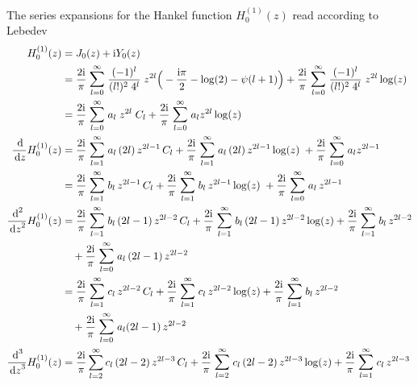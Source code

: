 The series expansions for the Hankel function $H_0^{(1)}(z)$ read according to Lebedev  \cite{lebedev}
\begin{align*}
  H_0^{(1)}(z)
  &= J_0(z) + \ii Y_0(z) \\
  &= \frac{2 \ii}{\pi} \; \mathlarger{\sum}_{l = 0}^\infty \; \frac{(-1)^l}{(l!)^2 \; 4^l} \;  z^{2l} \Big( -\frac{\ii \pi}{2} - \log(2) - \psi(l + 1) \Big) + \frac{2 \ii}{\pi} \; \mathlarger{\sum}_{l = 0}^\infty \; \frac{(-1)^l}{(l!)^2 \; 4^l} \;  z^{2l} \log(z) \\
  &= \frac{2 \ii}{\pi} \; \mathlarger{\sum}_{l = 0}^\infty \; a_l \;  z^{2l} \; C_l + \frac{2 \ii}{\pi} \; \mathlarger{\sum}_{l = 0}^\infty \; a_l z^{2l} \log(z) \\
  \frac{\d{}}{\d z} H_0^{(1)}(z)
  &= \frac{2 \ii}{\pi} \; \mathlarger{\sum}_{l = 1}^\infty \; a_l \,  (2l) \, z^{2l - 1} \, C_l + \frac{2 \ii}{\pi}  \; \mathlarger{\sum}_{l = 1}^\infty \; a_l \, (2l)  \, z^{2l - 1} \log(z) \; + \frac{2 \ii}{\pi}\; \mathlarger{\sum}_{l = 0}^\infty \; a_l z^{2l - 1} \\
  &= \frac{2 \ii}{\pi} \; \mathlarger{\sum}_{l = 1}^\infty \; b_l \, z^{2l - 1} \, C_l + \frac{2 \ii}{\pi}  \; \mathlarger{\sum}_{l = 1}^\infty \; b_l \, z^{2l - 1} \log(z) \; + \frac{2 \ii}{\pi}\; \mathlarger{\sum}_{l = 0}^\infty \; a_l \, z^{2l - 1} \\
  \frac{\d{}^2}{\d z^2} H_0^{(1)}(z)
  &= \frac{2 \ii}{\pi} \; \mathlarger{\sum}_{l = 1}^\infty \; b_l \, (2l - 1) \, z^{2l - 2} \, C_l + \frac{2 \ii}{\pi}  \; \mathlarger{\sum}_{l = 1}^\infty \; b_l \, (2l - 1)\, z^{2l - 2} \log(z) + \frac{2 \ii}{\pi} \; \mathlarger{\sum}_{l = 1}^\infty \; b_l \, z^{2l - 2} \\
  &\quad + \frac{2 \ii}{\pi}\; \mathlarger{\sum}_{l = 0}^\infty \; a_l \, (2l - 1) \, z^{2l - 2} \\
  &= \frac{2 \ii}{\pi} \; \mathlarger{\sum}_{l = 1}^\infty \; c_l \, z^{2l - 2} \, C_l + \frac{2 \ii}{\pi}  \; \mathlarger{\sum}_{l = 1}^\infty \; c_l \, z^{2l - 2} \log(z) + \frac{2 \ii}{\pi} \; \mathlarger{\sum}_{l = 1}^\infty \; b_l \, z^{2l - 2} \\
  &\quad + \frac{2 \ii}{\pi}\; \mathlarger{\sum}_{l = 0}^\infty \; a_l (2l - 1) \, z^{2l - 2} \\
  \frac{\d{}^3}{\d z^3} H_0^{(1)}(z)
  &= \frac{2 \ii}{\pi} \sum_{l = 2}^\infty c_l \, (2l - 2) \, z^{2l - 3} \, C_l + \frac{2 \ii}{\pi} \; \mathlarger{\sum}_{l = 2}^\infty \; c_l \, (2l - 2) \, z^{2l - 3} \log(z) + \frac{2 \ii}{\pi} \; \mathlarger{\sum}_{l = 1}^\infty \; c_l \, z^{2l - 3} \\

\end{align*}
